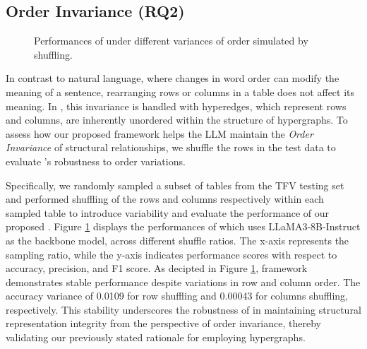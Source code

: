 {\subsection{Order Invariance (RQ2)}
\begin{figure}[t!]
    \centering
  \begin{minipage}[t]{0.49\linewidth} %
  \end{minipage}
  \begin{minipage}[t]{0.49\linewidth} %
  \end{minipage}
\vspace{-0.1in}
\caption{Performances of \name under different variances of order simulated by shuffling.}
\vspace{-0.2in}
\label{fig:order}
\end{figure}
In contrast to natural language, where changes in word order can modify the meaning of a sentence, rearranging rows or columns in a table does not affect its meaning. In \name, this invariance is handled with hyperedges, which represent rows and columns, are inherently unordered within the structure of hypergraphs. To assess how our proposed \name framework helps the LLM maintain the \textit{Order Invariance} of structural relationships, we shuffle the rows in the test data to evaluate \name's robustness to order variations. 

Specifically, we randomly sampled a subset of tables from the TFV testing set and performed shuffling of the rows and columns respectively within each sampled table to introduce variability and evaluate the performance of our proposed \name. Figure \ref{fig:order} displays the performances of \name which uses LLaMA3-8B-Instruct as the backbone model, across different shuffle ratios. The x-axis represents the sampling ratio, while the y-axis indicates performance scores with respect to accuracy, precision, and F1 score. As decipted in Figure \ref{fig:order}, \name framework demonstrates stable performance despite variations in row and column order. The accuracy variance of 0.0109 for row shuffling and 0.00043 for columns shuffling, respectively. This stability underscores the robustness of \name in maintaining structural representation integrity from the perspective of order invariance, thereby validating our previously stated rationale for employing hypergraphs.

}
